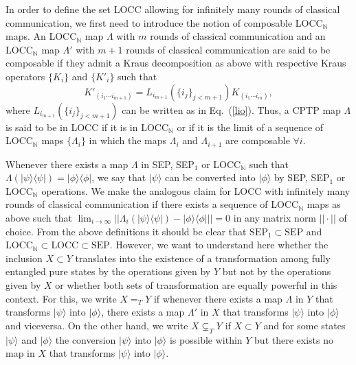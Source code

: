 \documentclass[superscriptaddress,twocolumn]{revtex4}\usepackage[utf8]{inputenc}
\newcommand{\N}{\mathbb{N}}
\begin{document}
In order to define the set LOCC allowing for infinitely many rounds of classical communication, we first need to introduce the notion of composable LOCC$_\mathbb{N}$ maps. An LOCC$_{\mathbb{N}}$ map $\Lambda$ with $m$ rounds of classical communication and an LOCC$_{\mathbb{N}}$ map $\Lambda'$ with $m+1$ rounds of classical communication are said to be composable if they admit a Kraus decomposition as above with respective Kraus operators $\{K_i\}$ and $\{K'_i\}$ such that
\begin{equation}
K'_{(i_1\cdots i_{m+1})}=L_{i_{m+1}}(\{i_j\}_{j<m+1})K_{(i_1\cdots i_m)},
\end{equation}
where $L_{i_{m+1}}(\{i_j\}_{j<m+1})$ can be written as in Eq.\ (\ref{lio}). Thus, a CPTP map $\Lambda$ is said to be in LOCC if it is in $\textrm{LOCC}_\N$ or if it is the limit of a sequence of LOCC$_{\mathbb{N}}$ maps $\{\Lambda_i\}$ in which the maps $\Lambda_i$ and $\Lambda_{i+1}$ are composable $\forall i$.

Whenever there exists a map $\Lambda$ in SEP, SEP$_1$ or LOCC$_\mathbb{N}$ such that $\Lambda(|\psi\rangle\langle\psi|)=|\phi\rangle\langle\phi|$, we say that $|\psi\rangle$ can be converted into $|\phi\rangle$ by SEP, SEP$_1$ or LOCC$_\mathbb{N}$ operations. We make the analogous claim for LOCC with infinitely many rounds of classical communication if there exists a sequence of LOCC$_{\mathbb{N}}$ maps as above such that $\lim_{i\to\infty}||\Lambda_i(|\psi\rangle\langle\psi|)-|\phi\rangle\langle\phi|||=0$ in any matrix norm $||\cdot||$ of choice. From the above definitions it should be clear that $\textrm{SEP}_1\subset \textrm{SEP}$ and $\textrm{LOCC}_\mathbb{N}\subset \textrm{LOCC} \subset \textrm{SEP}$. However, we want to understand here whether the inclusion $X\subset Y$ translates into the existence of a transformation among fully entangled pure states by the operations given by $Y$ but not by the operations given by $X$ or whether both sets of transformation are equally powerful in this context. For this, we write $X=_TY$ if whenever there exists a map $\Lambda$ in $Y$ that transforms $|\psi\rangle$ into $|\phi\rangle$, there exists a map $\Lambda'$ in $X$ that transforms $|\psi\rangle$ into $|\phi\rangle$ and viceversa. On the other hand, we write $X\subsetneq_TY$ if $X\subset Y$ and for some states $|\psi\rangle$ and $|\phi\rangle$ the conversion $|\psi\rangle$ into $|\phi\rangle$ is possible within $Y$ but there exists no map in $X$ that transforms $|\psi\rangle$ into $|\phi\rangle$.
\end{document}
